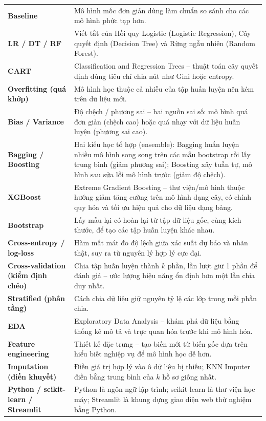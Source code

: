 \documentclass[12pt,a4paper,oneside]{report}
\theoremstyle{vnplain}
\theoremstyle{vndef}
\begin{document}
\begin{longtable}{>{\raggedright\arraybackslash\bfseries}p{4.1cm} p{10.1cm}}
Baseline & Mô hình mốc đơn giản dùng làm chuẩn so sánh cho các mô hình phức tạp hơn.\\
LR / DT / RF & Viết tắt của Hồi quy Logistic (Logistic Regression), Cây quyết định (Decision Tree) và Rừng ngẫu nhiên (Random Forest).\\
CART & Classification and Regression Trees -- thuật toán cây quyết định dùng tiêu chí chia nút như Gini hoặc entropy.\\
Overfitting (quá khớp) & Mô hình học thuộc cả nhiễu của tập huấn luyện nên kém trên dữ liệu mới.\\
Bias / Variance & Độ chệch / phương sai -- hai nguồn sai số: mô hình quá đơn giản (chệch cao) hoặc quá nhạy với dữ liệu huấn luyện (phương sai cao).\\
Bagging / Boosting & Hai kiểu học tổ hợp (ensemble): Bagging huấn luyện nhiều mô hình song song trên các mẫu bootstrap rồi lấy trung bình (giảm phương sai); Boosting xây tuần tự, mô hình sau sửa lỗi mô hình trước (giảm độ chệch).\\
XGBoost & Extreme Gradient Boosting -- thư viện/mô hình thuộc hướng giảm tăng cường trên mô hình dạng cây, có chính quy hóa và tối ưu hiệu quả cho dữ liệu dạng bảng.\\
Bootstrap & Lấy mẫu lại có hoàn lại từ tập dữ liệu gốc, cùng kích thước, để tạo các tập huấn luyện khác nhau.\\
Cross-entropy / log-loss & Hàm mất mát đo độ lệch giữa xác suất dự báo và nhãn thật, suy ra từ nguyên lý hợp lý cực đại.\\
Cross-validation (kiểm định chéo) & Chia tập huấn luyện thành $k$ phần, lần lượt giữ 1 phần để đánh giá -- ước lượng hiệu năng ổn định hơn một lần chia duy nhất.\\
Stratified (phân tầng) & Cách chia dữ liệu giữ nguyên tỷ lệ các lớp trong mỗi phần chia.\\
EDA & Exploratory Data Analysis -- khám phá dữ liệu bằng thống kê mô tả và trực quan hóa trước khi mô hình hóa.\\
Feature engineering & Thiết kế đặc trưng -- tạo biến mới từ biến gốc dựa trên hiểu biết nghiệp vụ để mô hình học dễ hơn.\\
Imputation (điền khuyết) & Điền giá trị hợp lý vào ô dữ liệu bị thiếu; KNN Imputer điền bằng trung bình của $k$ hồ sơ giống nhất.\\
Python / scikit-learn / Streamlit & Python là ngôn ngữ lập trình; scikit-learn là thư viện học máy; Streamlit là khung dựng giao diện web thử nghiệm bằng Python.\\

\end{longtable}
\end{document}
